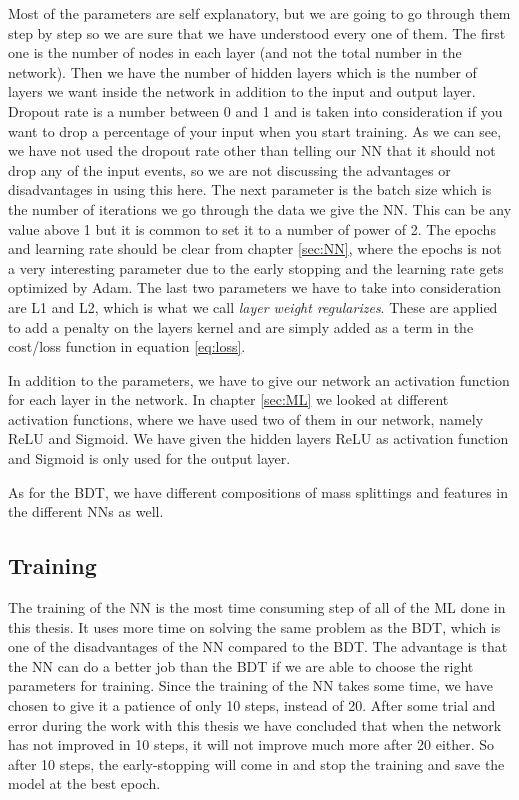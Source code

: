Most of the parameters are self explanatory, but we are going to go through them step by step so we are sure that we have understood every one of them. The first one is the number of nodes in each layer (and not the total number in the network). Then we have the number of hidden layers which is the number of layers we want inside the network in addition to the input and output layer. Dropout rate is a number between 0 and 1 and is taken into consideration if you want to drop a percentage of your input when you start training. As we can see, we have not used the dropout rate other than telling our NN that it should not drop any of the input events, so we are not discussing the advantages or disadvantages in using this here. The next parameter is the batch size which is the number of iterations we go through the data we give the NN. This can be any value above 1 but it is common to set it to a number of power of 2. The epochs and learning rate should be clear from chapter \ref{sec:NN}, where the epochs is not a very interesting parameter due to the early stopping and the learning rate gets optimized by Adam. The last two parameters we have to take into consideration are L1 and L2, which is what we call \textit{layer weight regularizes}. These are applied to add a penalty on the layers kernel and are simply added as a term in the cost/loss function in equation \ref{eq:loss}.

In addition to the parameters, we have to give our network an activation function for each layer in the network. In chapter \ref{sec:ML} we looked at different activation functions, where we have used two of them in our network, namely ReLU and Sigmoid. We have given the hidden layers ReLU as activation function and Sigmoid is only used for the output layer. 

As for the BDT, we have different compositions of mass splittings and features in the different NNs as well. 

\subsection{Training}
The training of the NN is the most time consuming step of all of the ML done in this thesis. It uses more time on solving the same problem as the BDT, which is one of the disadvantages of the NN compared to the BDT. The advantage is that the NN can do a better job than the BDT if we are able to choose the right parameters for training. Since the training of the NN takes some time, we have chosen to give it a patience of only 10 steps, instead of 20. After some trial and error during the work with this thesis we have concluded that when the network has not improved in 10 steps, it will not improve much more after 20 either. So after 10 steps, the early-stopping will come in and stop the training and save the model at the best epoch. 

